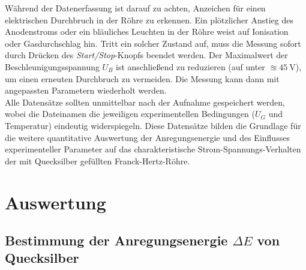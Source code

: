 Während der Datenerfassung ist darauf zu achten, Anzeichen für einen elektrischen Durchbruch in der Röhre zu erkennen. Ein plötzlicher Anstieg des Anodenstroms oder ein bläuliches Leuchten in der Röhre weist auf Ionisation oder Gasdurchschlag hin. Tritt ein solcher Zustand auf, muss die Messung sofort durch Drücken des \textit{Start/Stop}-Knopfs beendet werden. Der Maximalwert der Beschleunigungsspannung $U_B$ ist anschließend zu reduzieren (auf unter $\approxeq\SI{45}{\volt}$), um einen erneuten Durchbruch zu vermeiden. Die Messung kann dann mit angepassten Parametern wiederholt werden.
\vspace{0.3cm}\\
Alle Datensätze sollten unmittelbar nach der Aufnahme gespeichert werden, wobei die Dateinamen die jeweiligen experimentellen Bedingungen ($U_G$ und Temperatur) eindeutig widerspiegeln. Diese Datensätze bilden die Grundlage für die weitere quantitative Auswertung der Anregungsenergie und des Einflusses experimenteller Parameter auf das charakteristische Strom-Spannungs-Verhalten der mit Quecksilber gefüllten Franck-Hertz-Röhre.
\section{Auswertung}


\subsection*{Bestimmung der Anregungsenergie $\Delta E$ von Quecksilber}

